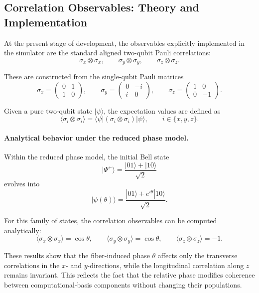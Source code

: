 \documentclass[a4paper]{article}
\begin{document}

\subsection{Correlation Observables: Theory and Implementation}

At the present stage of development, the observables explicitly implemented in the simulator are the standard aligned two-qubit Pauli correlations:
\[
\sigma_x \otimes \sigma_x,\qquad
\sigma_y \otimes \sigma_y,\qquad
\sigma_z \otimes \sigma_z.
\]

These are constructed from the single-qubit Pauli matrices
\[
\sigma_x=
\begin{pmatrix}
0 & 1\\
1 & 0
\end{pmatrix},
\qquad
\sigma_y=
\begin{pmatrix}
0 & -i\\
i & 0
\end{pmatrix},
\qquad
\sigma_z=
\begin{pmatrix}
1 & 0\\
0 & -1
\end{pmatrix}.
\]

Given a pure two-qubit state \( |\psi\rangle \), the expectation values are defined as
\[
\langle \sigma_i \otimes \sigma_i \rangle
=
\langle \psi|
(\sigma_i \otimes \sigma_i)
|\psi\rangle,
\qquad i\in\{x,y,z\}.
\]

\paragraph{Analytical behavior under the reduced phase model.}

Within the reduced phase model, the initial Bell state
\[
|\Psi^+\rangle = \frac{|01\rangle + |10\rangle}{\sqrt{2}}
\]
evolves into
\[
|\psi(\theta)\rangle
=
\frac{|01\rangle + e^{i\theta}|10\rangle}{\sqrt{2}}.
\]

For this family of states, the correlation observables can be computed analytically:
\[
\langle \sigma_x \otimes \sigma_x \rangle = \cos\theta,
\qquad
\langle \sigma_y \otimes \sigma_y \rangle = \cos\theta,
\qquad
\langle \sigma_z \otimes \sigma_z \rangle = -1.
\]

These results show that the fiber-induced phase \(\theta\) affects only the transverse correlations in the \(x\)- and \(y\)-directions, while the longitudinal correlation along \(z\) remains invariant. This reflects the fact that the relative phase modifies coherence between computational-basis components without changing their populations.
\end{document}
